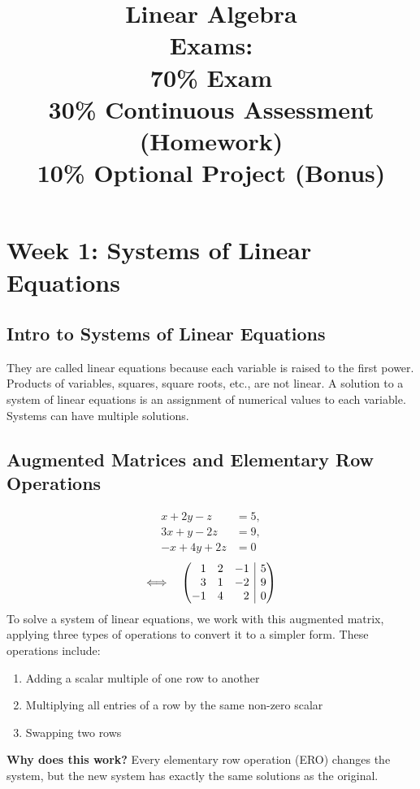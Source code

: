 \documentclass[4pt]{article}
\title{
Linear Algebra\\[2ex]
Exams:\\
70\% Exam\\
30\% Continuous Assessment (Homework) \\
10\% Optional Project (Bonus)\\
}
\author{}     %
\date{}       %
\theoremstyle{definition}
\theoremstyle{plain}
\begin{document}
\maketitle
\pagebreak

\tableofcontents
\pagebreak

\section{Week 1: Systems of Linear Equations}

\subsection{Intro to Systems of Linear Equations}
They are called linear equations because each variable is raised to the first power. Products of variables, squares, square roots, etc., are not linear.
A solution to a system of linear equations is an assignment of numerical values to each variable. Systems can have multiple solutions.

\subsection{Augmented Matrices and Elementary Row Operations}

\begin{align}
  x + 2y - z   & = 5, \\
  3x + y - 2z  & = 9, \\
  -x + 4y + 2z & = 0
\end{align}
\[
  \Longleftrightarrow
  \quad
  \left(\begin{array}{@{} r r r | r @{}}
      1  & 2 & -1 & 5 \\
      3  & 1 & -2 & 9 \\
      -1 & 4 & 2  & 0
    \end{array}\right)
\]
To solve a system of linear equations, we work with this augmented matrix,
applying three types of operations to convert it to a simpler form. These operations include:
\begin{enumerate}
  \item Adding a scalar multiple of one row to another
  \item Multiplying all entries of a row by the same non-zero scalar
  \item Swapping two rows
\end{enumerate}
\textbf{Why does this work?} Every elementary row operation (ERO) changes the system, but the new system has exactly the same solutions as the original.
\end{document}
